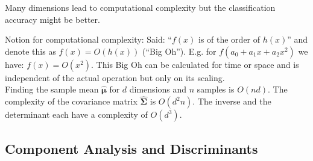   
  Many dimensions lead to computational complexity but the classification accuracy might be better.
  
  
  Notion for computational complexity: Said: ``$f(x)$ is of the order of $h(x)$'' and denote this as
  $f(x) = O(h(x))$ (``Big Oh''). E.g. for $f(a_0+a_1x+a_2x^2)$ we have: $f(x) = O(x^2)$.
  This Big Oh can be calculated for time or space and is independent of the actual operation but
  only on its scaling. \\
  
  Finding the sample mean $\hat{\boldsymbol{\mu}}$ for $d$ dimensions and $n$ samples is $O(nd)$.
  The complexity of the covariance matrix $\hat{\boldsymbol{\Sigma}}$ is $O(d^2n)$. 
  The inverse and the determinant each have a complexity of $O(d^3)$.
  
  \subsection{Component Analysis and Discriminants}
  

